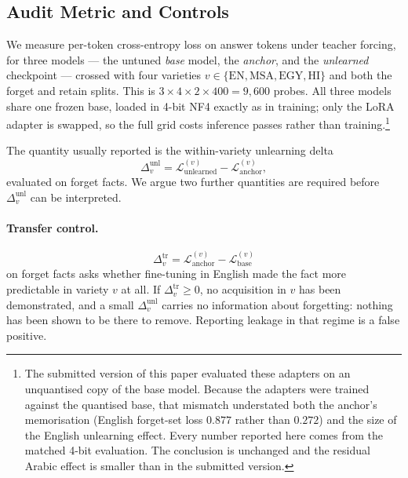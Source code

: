 \documentclass[11pt]{article}
\begin{document}
\subsection{Audit Metric and Controls}
\label{sec:metric}
We measure per-token cross-entropy loss on answer tokens under teacher
forcing, for three models — the untuned \emph{base} model, the \emph{anchor},
and the \emph{unlearned} checkpoint — crossed with four varieties
$v \in \{\text{EN}, \text{MSA}, \text{EGY}, \text{HI}\}$ and both the forget
and retain splits. This is $3 \times 4 \times 2 \times 400 = 9{,}600$ probes.
All three models share one frozen base, loaded in 4-bit NF4 exactly as in
training; only the LoRA adapter is swapped, so the full grid costs inference
passes rather than training.\footnote{The submitted version of this paper
evaluated these adapters on an unquantised copy of the base model. Because
the adapters were trained against the quantised base, that mismatch
understated both the anchor's memorisation (English forget-set loss $0.877$
rather than $0.272$) and the size of the English unlearning effect. Every
number reported here comes from the matched 4-bit evaluation. The conclusion
is unchanged and the residual Arabic effect is smaller than in the submitted
version.}

The quantity usually reported is the within-variety unlearning delta
\[
  \Delta_v^{\text{unl}} = \mathcal{L}_\text{unlearned}^{(v)}
                        - \mathcal{L}_\text{anchor}^{(v)} ,
\]
evaluated on forget facts. We argue two further quantities are required
before $\Delta_v^{\text{unl}}$ can be interpreted.

\paragraph{Transfer control.}
\[
  \Delta_v^{\text{tr}} = \mathcal{L}_\text{anchor}^{(v)}
                       - \mathcal{L}_\text{base}^{(v)}
\]
on forget facts asks whether fine-tuning in English made the fact more
predictable in variety $v$ at all. If $\Delta_v^{\text{tr}} \geq 0$, no
acquisition in $v$ has been demonstrated, and a small $\Delta_v^{\text{unl}}$
carries no information about forgetting: nothing has been shown to be there
to remove. Reporting leakage in that regime is a false positive.
\end{document}

